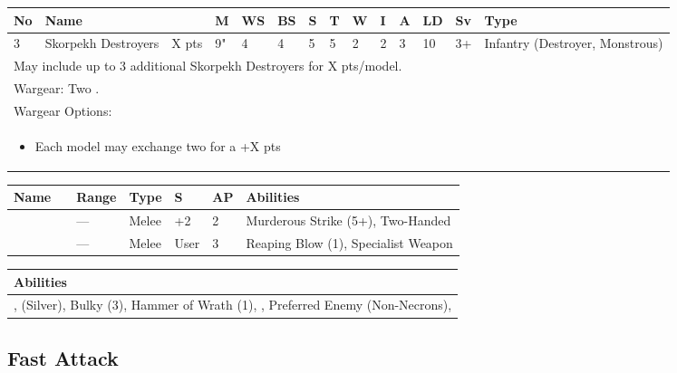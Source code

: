 \noindent
\begin{tabular}{||m{10pt} m{95pt} m{30pt} m{11pt} m{11pt} m{11pt} m{11pt} m{11pt} m{11pt} m{11pt} m{11pt} m{11pt} m{11pt} m{125pt}||}
	\hline
	No & Name & & M & WS & BS & S & T & W & I & A & LD & Sv & Type \\
	\hline
	3 & Skorpekh Destroyers & X pts & 9" & 4 & 4 & 5 & 5 & 2 & 2 & 3 & 10 & 3+ & Infantry (Destroyer, Monstrous) \\
	\hline
	\hline
	\multicolumn{14}{||Z{532 pt}||}{May include up to 3 additional Skorpekh Destroyers for X pts/model.}\\	
	\hline
	\hline
	\multicolumn{14}{||Z{532 pt}||}{Wargear: Two \quickref{Hyperphase Thresher}.} \\
	\multicolumn{14}{||Z{532 pt}||}{Wargear Options:} \\	\multicolumn{14}{||Z{532 pt}||}{\begin{itemize}
			\item Each model may exchange two \quickref{Hyperphase Thresher} for a \quickref{Hyperphase Reap-Blade} \hrulefill +X pts
	\end{itemize}} \\
	\hline
\end{tabular}

\noindent
\begin{tabular}{||m{110pt} m{30pt} m{31pt} m{55pt} m{12pt} m{12pt} m{210pt}||}
	\hline
	Name & & Range & Type & S & AP & Abilities \\
	\hline
	\quickref{Hyperphase Reap-Blade} &  & — & Melee & +2 & 2 & Murderous Strike (5+), Two-Handed \\
	\quickref{Hyperphase Thresher} &  & — & Melee & User & 3 & Reaping Blow (1), Specialist Weapon \\
	\hline
\end{tabular}

\noindent
\begin{tabular}{||m{532pt}||}
	\hline
	Abilities \\
	\hline
	\quickref{Annihilation Protocols}, \quickref{Awakening Protocols} (Silver), Bulky (3), Hammer of Wrath (1), \quickref{Living Metal}, Preferred Enemy (Non-Necrons), \quickref{Reanimation Protocols} \\
	\hline
\end{tabular}



\newpage
\subsection{Fast Attack}


